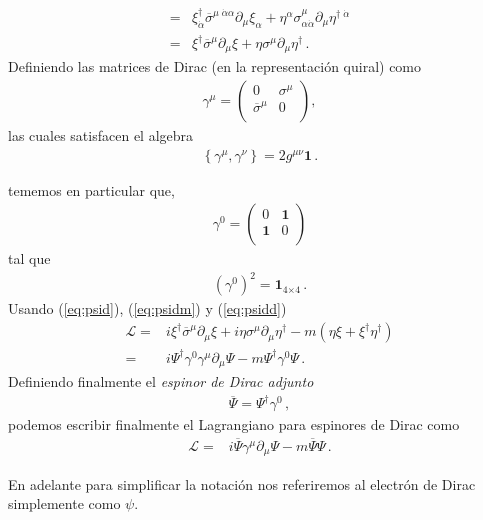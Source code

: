 \begin{frame}
\begin{align}
=&\xi^{\dagger}_{\dot{\alpha}}\overline{\sigma}^{\mu\;\dot{\alpha}\alpha}\partial_{\mu}\xi_{\alpha}+\eta^{\alpha}\sigma^{\mu}_{\alpha\dot{\alpha}}\partial_{\mu}\eta^{\dagger\;\dot{\alpha}}\nonumber\\
=&\xi^{\dagger}\overline{\sigma}^{\mu}\partial_{\mu}\xi+\eta\sigma^{\mu}\partial_{\mu}\eta^{\dagger}\,.
\end{align}
Definiendo las matrices de Dirac (en la representación quiral) como
\begin{align}
  \gamma^\mu= \begin{pmatrix}
    0           &\sigma^{\mu}\\
    \overline{\sigma}^{\mu} &0\\
  \end{pmatrix},
\end{align}
las cuales satisfacen el algebra
\begin{align}
  \left\{ \gamma^{\mu},\gamma^{\nu} \right\}=2 g^{\mu\nu}\mathbf{1}\,.
\end{align}

tememos en particular que, 
\begin{align}
  \gamma^0= \begin{pmatrix}
    0           &\mathbf{1}\\
    \mathbf{1} &0\\
  \end{pmatrix}
\end{align}
tal que
\begin{align}
  \left( \gamma^{0} \right)^2=\mathbf{1}_{\text{4$\times 4$}}\,.
\end{align}
Usando (\ref{eq:psid}), (\ref{eq:psidm}) y (\ref{eq:psidd})
\begin{align}
  \mathcal{L}=&i\xi^{\dagger}\overline{\sigma}^{\mu}\partial_{\mu}\xi+i\eta\sigma^{\mu}\partial_{\mu}\eta^{\dagger}
-m \left(\eta\xi+\xi^{\dagger}\eta^{\dagger} \right)\nonumber\\
=&i\Psi^{\dagger}\gamma^{0}\gamma^{\mu}\partial_{\mu}\Psi-m\Psi^{\dagger}\gamma^{0}\Psi\,.
\end{align}
Definiendo finalmente el \emph{espinor de Dirac adjunto}
\begin{align}
  \overline{\Psi}=\Psi^{\dagger}\gamma^{0}\,,
\end{align}
podemos escribir finalmente el Lagrangiano para espinores de Dirac  como
\begin{align}
  \mathcal{L}=&i\overline{\Psi}\gamma^{\mu}\partial_{\mu}\Psi-m\overline{\Psi}\Psi\,.
\end{align}
\end{frame}
En adelante para simplificar la notación nos referiremos al electrón de Dirac simplemente como $\psi$.

